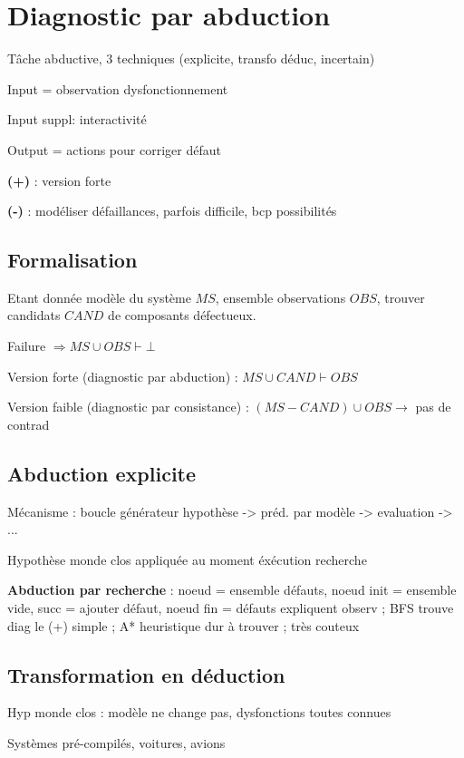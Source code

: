 \section*{Diagnostic par abduction}

Tâche abductive, 3 techniques (explicite, transfo déduc, incertain)

Input = observation dysfonctionnement

Input suppl: interactivité

Output = actions pour corriger défaut

\textbf{(+)} : version forte 

\textbf{(-)} : modéliser défaillances, parfois difficile, bcp possibilités

\subsection*{Formalisation}

Etant donnée modèle du système $MS$, ensemble observations $OBS$, trouver candidats $CAND$ de composants défectueux. 

Failure $\Rightarrow MS \cup OBS \vdash \bot$

Version forte (diagnostic par abduction) : $MS \cup CAND \vdash OBS$

Version faible (diagnostic par consistance) : $(MS - CAND) \cup OBS \rightarrow$ pas de contrad

\subsection*{Abduction explicite}

Mécanisme : boucle générateur hypothèse -> préd. par modèle -> evaluation -> ...

Hypothèse monde clos appliquée au moment éxécution recherche

\textbf{Abduction par recherche} : noeud  = ensemble défauts, noeud init = ensemble vide, succ = ajouter défaut, noeud fin = défauts expliquent observ ; BFS trouve diag le (+) simple ; A* heuristique dur à trouver ; très couteux


\subsection*{Transformation en déduction}

Hyp monde clos : modèle ne change pas, dysfonctions toutes connues

Systèmes pré-compilés, voitures, avions

